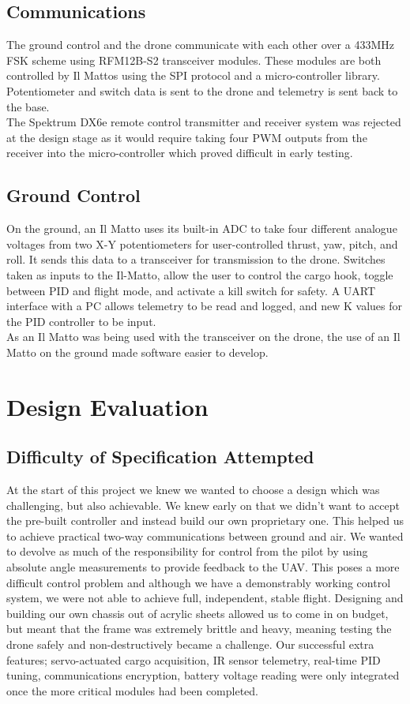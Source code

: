 \documentclass[a4paper,11pt]{article}
\begin{document}
\subsection{Communications}
The ground control and the drone communicate with each other over a 433MHz FSK scheme using RFM12B-S2 transceiver modules. These modules are both controlled by Il Mattos using the SPI protocol and a micro-controller library. Potentiometer and switch data is sent to the drone and telemetry is sent back to the base.\\
The Spektrum DX6e remote control transmitter and receiver system was rejected at the design stage as it would require taking four PWM outputs from the receiver into the micro-controller which proved difficult in early testing.\\ 
\subsection{Ground Control}
On the ground, an Il Matto uses its built-in ADC to take four different analogue voltages from two X-Y potentiometers for user-controlled thrust, yaw, pitch, and roll. It sends this data to a transceiver for transmission to the drone. Switches taken as inputs to the Il-Matto, allow the user to control the cargo hook, toggle between PID and flight mode, and activate a kill switch for safety. A UART interface with a PC allows telemetry to be read and logged, and new K values for the PID controller to be input.\\
As an Il Matto was being used with the transceiver on the drone, the use of an Il Matto on the ground made software easier to develop.\\

\section{Design Evaluation}
\subsection{Difficulty of Specification Attempted}
At the start of this project we knew we wanted to choose a design which was challenging, but also achievable.
We knew early on that we didn't want to accept the pre-built controller and instead build our own proprietary one. This helped us to achieve practical two-way communications between ground and air. 
We wanted to devolve as much of the responsibility for control from the pilot by using absolute angle measurements to provide feedback to the UAV. This poses a more difficult control problem and although we have a demonstrably working control system, we were not able to achieve full, independent, stable flight.
Designing and building our own chassis out of acrylic sheets allowed us to come in on budget, but meant that the frame was extremely brittle and heavy, meaning testing the drone safely and non-destructively became a challenge.
Our successful extra features; servo-actuated cargo acquisition, IR sensor telemetry, real-time PID tuning, communications encryption, battery voltage reading were only integrated once the more critical modules had been completed. 
\end{document}
